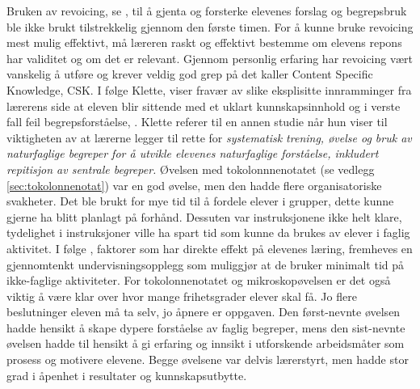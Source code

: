 \documentclass[main.tex]{subfiles}
\begin{document}
Bruken av revoicing, se , til å gjenta og forsterke elevenes forslag og begrepsbruk ble ikke brukt tilstrekkelig gjennom den første timen.
For å kunne bruke revoicing mest mulig effektivt, må læreren raskt og effektivt bestemme om elevens repons har validitet og om det er relevant.
Gjennom personlig erfaring har revoicing vært vanskelig å utføre og krever veldig god grep på det  kaller Content Specific Knowledge, CSK.
I følge Klette, viser fravær av slike eksplisitte innramminger fra lærerens side at eleven blir sittende med et uklart kunnskapsinnhold og i verste fall feil
begrepsforståelse, . Klette referer til en annen studie  når hun viser til viktigheten av at lærerne legger 
til rette for 
\emph{systematisk trening, øvelse og bruk av naturfaglige begreper for å utvikle elevenes naturfaglige forståelse, inkludert repitisjon av sentrale begreper.}
\newline
\newline
Øvelsen med tokolonnnenotatet (se vedlegg \ref{sec:tokolonnenotat}) var en god øvelse, men den hadde flere organisatoriske svakheter. Det ble brukt for mye
tid til å fordele elever i grupper, dette kunne gjerne ha blitt planlagt på forhånd. Dessuten var instruksjonene ikke helt klare, tydelighet i instruksjoner
ville ha spart tid som kunne da brukes av elever i faglig aktivitet. I følge , faktorer som har direkte effekt på elevenes læring,
fremheves en gjennomtenkt undervisningsopplegg som muliggjør at de bruker minimalt tid på ikke-faglige aktiviteter. For tokolonnenotatet og mikroskopøvelsen 
er det også viktig å være klar over hvor mange frihetsgrader elever skal få. Jo flere beslutninger eleven må ta selv, jo åpnere er oppgaven. Den først-nevnte
øvelsen hadde hensikt å skape dypere forståelse av faglig begreper, mens den sist-nevnte øvelsen hadde til hensikt å gi erfaring og innsikt i utforskende
arbeidsmåter som prosess og motivere elevene. Begge øvelsene var delvis lærerstyrt, men hadde stor grad i åpenhet i resultater og kunnskapsutbytte.
\end{document}
